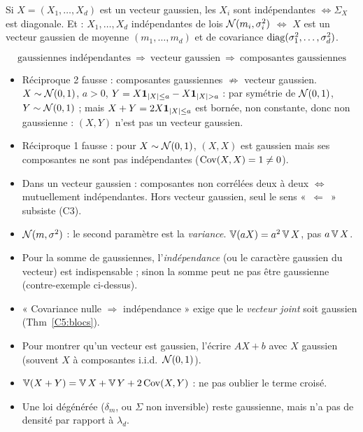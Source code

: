 \documentclass[11pt,a4paper]{article}
\begin{document}
\begin{corollaire}\label{C5:diag}
Si $X=(X_1,\dots,X_d)$ est un vecteur gaussien, les $X_i$ sont indépendantes $\iff\Sigma_X$ est diagonale.
Et : $X_1,\dots,X_d$ indépendantes de lois $\mathcal{N}(m_i,\sigma_i^2)$ $\iff$ $X$ est un vecteur gaussien de moyenne
$(m_1,\dots,m_d)$ et de covariance $\operatorname{diag}(\sigma_1^2,\dots,\sigma_d^2)$.
\end{corollaire}

\begin{liens}
\[\text{gaussiennes indépendantes}\ \Longrightarrow\ \text{vecteur gaussien}\ \Longrightarrow\ \text{composantes gaussiennes}\]
\begin{itemize}
  \item Réciproque 2 fausse : composantes gaussiennes $\not\Rightarrow$ vecteur gaussien. $X\sim\mathcal{N}(0,1)$, $a>0$,
  $Y=X\1_{|X|\le a}-X\1_{|X|>a}$ : par symétrie de $\mathcal{N}(0,1)$, $Y\sim\mathcal{N}(0,1)$ ; mais $X+Y=2X\mathbf{1}_{|X|\le a}$ est bornée,
  non constante, donc non gaussienne : $(X,Y)$ n'est pas un vecteur gaussien.
  \item Réciproque 1 fausse : pour $X\sim\mathcal{N}(0,1)$, $(X,X)$ est gaussien mais ses composantes ne sont pas indépendantes ($\operatorname{Cov}(X,X)=1\neq0$).
  \item Dans un vecteur gaussien : composantes non corrélées deux à deux $\iff$ mutuellement indépendantes. Hors vecteur gaussien, seul le sens «~$\Leftarrow$~» subsiste (C3).
\end{itemize}
\end{liens}

\begin{piege}
\begin{itemize}
  \item $\mathcal{N}(m,\sigma^2)$ : le second paramètre est la \emph{variance}. $\operatorname{\mathbb{V}}(aX)=a^2\operatorname{\mathbb{V}} X$, pas $a\operatorname{\mathbb{V}} X$.
  \item Pour la somme de gaussiennes, l'\emph{indépendance} (ou le caractère gaussien du vecteur) est indispensable ;
  sinon la somme peut ne pas être gaussienne (contre-exemple ci-dessus).
  \item « Covariance nulle $\Rightarrow$ indépendance » exige que le \emph{vecteur joint} soit gaussien (Thm~\ref{C5:blocs}).
  \item Pour montrer qu'un vecteur est gaussien, l'écrire $AX+b$ avec $X$ gaussien (souvent $X$ à composantes i.i.d.\ $\mathcal{N}(0,1)$).
  \item $\operatorname{\mathbb{V}}(X+Y)=\operatorname{\mathbb{V}} X+\operatorname{\mathbb{V}} Y+2\operatorname{Cov}(X,Y)$ : ne pas oublier le terme croisé.
  \item Une loi dégénérée ($\delta_m$, ou $\Sigma$ non inversible) reste gaussienne, mais n'a pas de densité par rapport à $\lambda_d$.
\end{itemize}
\end{piege}
\end{document}
